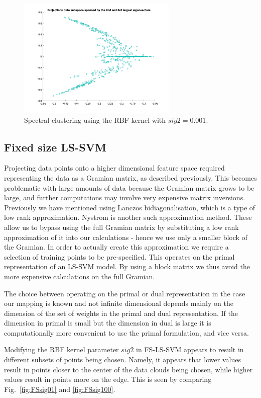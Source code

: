\documentclass[10pt,a4paper]{article}
\begin{document}
\begin{figure}[h!]
\centering
  \includegraphics[width=3in]{rings0001.png}
  \caption{Spectral clustering using the RBF kernel with $sig2=0.001$.}
  \label{fig:rings0001}
\end{figure}

\subsection{Fixed size LS-SVM}
Projecting data points onto a higher dimensional feature space required representing the data as a Gramian matrix, as described previously. This becomes problematic with large amounts of data because the Gramian matrix grows to be large, and further computations may involve very expensive matrix inversions. Previously we have mentioned using Lanczos bidiagonalisation, which is a type of low rank approximation. Nystrom is another such approximation method. These allow us to bypass using the full Gramian matrix by substituting a low rank approximation of it into our calculations - hence we use only a smaller block of the Gramian. In order to actually create this approximation we require a selection of training points to be pre-specified. This operates on the primal representation of an LS-SVM model. By using a block matrix we thus avoid the more expensive calculations on the full Gramian.

The choice between operating on the primal or dual representation in the case our mapping is known and not infinite dimensional depends mainly on the dimension of the set of weights in the primal and dual representation. If the dimension in primal is small but the dimension in dual is large it is computationally more convenient to use the primal formulation, and vice versa.

Modifying the RBF kernel parameter $sig2$ in FS-LS-SVM appears to result in different subsets of points being chosen. Namely, it appears that lower values result in points closer to the center of the data clouds being chosen, while higher values result in points more on the edge. This is seen by comparing Fig.~\ref{fig:FSsig01} and \ref{fig:FSsig100}.
\end{document}
